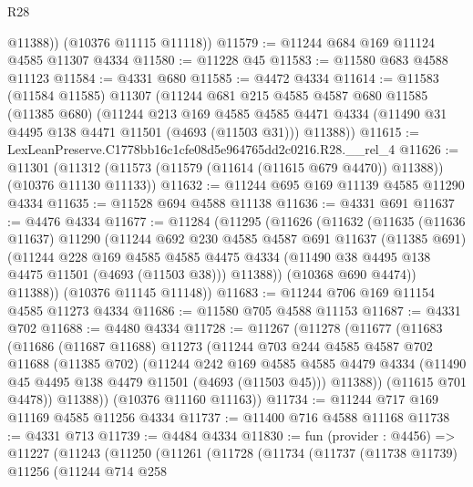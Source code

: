 \begin{lexlean}{R28}
\begin{coremodule}
          @11388))
      (@10376 @11115 @11118))
@11579 := @11244 @684 @169 @11124 @4585 @11307 @4334
@11580 := @11228 @45
@11583 := @11580 @683 @4588 @11123
@11584 := @4331 @680
@11585 := @4472 @4334
@11614 := @11583
    (@11584 @11585)
    @11307
    (@11244
      @681
      @215
      @4585
      @4587
      @680
      @11585
      (@11385 @680)
      (@11244
        @213
        @169
        @4585
        @4585
        @4471
        @4334
        (@11490 @31 @4495 @138 @4471 @11501 (@4693 (@11503 @31)))
        @11388))
@11615 := LexLeanPreserve.C1778bb16c1cfe08d5e964765dd2c0216.R28.__rel_4
@11626 := @11301
    (@11312 (@11573 (@11579 (@11614 (@11615 @679 @4470)) @11388)) (@10376 @11130 @11133))
@11632 := @11244 @695 @169 @11139 @4585 @11290 @4334
@11635 := @11528 @694 @4588 @11138
@11636 := @4331 @691
@11637 := @4476 @4334
@11677 := @11284
    (@11295
      (@11626
        (@11632
          (@11635
            (@11636 @11637)
            @11290
            (@11244
              @692
              @230
              @4585
              @4587
              @691
              @11637
              (@11385 @691)
              (@11244
                @228
                @169
                @4585
                @4585
                @4475
                @4334
                (@11490 @38 @4495 @138 @4475 @11501 (@4693 (@11503 @38)))
                @11388))
            (@10368 @690 @4474))
          @11388))
      (@10376 @11145 @11148))
@11683 := @11244 @706 @169 @11154 @4585 @11273 @4334
@11686 := @11580 @705 @4588 @11153
@11687 := @4331 @702
@11688 := @4480 @4334
@11728 := @11267
    (@11278
      (@11677
        (@11683
          (@11686
            (@11687 @11688)
            @11273
            (@11244
              @703
              @244
              @4585
              @4587
              @702
              @11688
              (@11385 @702)
              (@11244
                @242
                @169
                @4585
                @4585
                @4479
                @4334
                (@11490 @45 @4495 @138 @4479 @11501 (@4693 (@11503 @45)))
                @11388))
            (@11615 @701 @4478))
          @11388))
      (@10376 @11160 @11163))
@11734 := @11244 @717 @169 @11169 @4585 @11256 @4334
@11737 := @11400 @716 @4588 @11168
@11738 := @4331 @713
@11739 := @4484 @4334
@11830 := fun (provider : @4456) =>
  @11227
    (@11243
      (@11250
        (@11261
          (@11728
            (@11734
              (@11737
                (@11738 @11739)
                @11256
                (@11244
                  @714
                  @258

\end{coremodule}
\end{lexlean}
